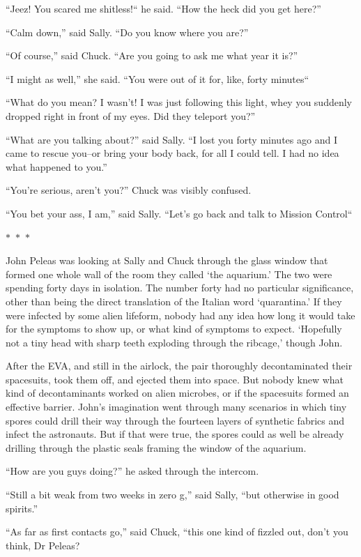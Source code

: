 \documentclass{memoir}
\newcommand{\starbreak}{%
\begin{center}
  $\ast$~$\ast$~$\ast$
\end{center}
}
\begin{document}
``Jeez! You scared me shitless!`` he said. ``How the heck did you get here?''

``Calm down,'' said Sally. ``Do you know where you are?''

``Of course,'' said Chuck. ``Are you going to ask me what year it is?''

``I might as well,'' she said. ``You were out of it for, like, forty minutes``

``What do you mean? I wasn't! I was just following this light, whey you suddenly dropped right in front of my eyes. Did they teleport you?''

``What are you talking about?'' said Sally. ``I lost you forty minutes ago and I came to rescue you--or bring your body back, for all I could tell. I had no idea what happened to you.''

``You're serious, aren't you?'' Chuck was visibly confused. 

``You bet your ass, I am,'' said Sally. ``Let's go back and talk to Mission Control``

\starbreak

John Peleas was looking at Sally and Chuck through the glass window that formed one whole wall of the room they called `the aquarium.' The two were spending forty days in isolation. The number forty had no particular significance, other than being the direct translation of the Italian word `quarantina.' If they were infected by some alien lifeform, nobody had any idea how long it would take for the symptoms to show up, or what kind of symptoms to expect. `Hopefully not a tiny head with sharp teeth exploding through the ribcage,' though John.

After the EVA, and still in the airlock, the pair thoroughly decontaminated their spacesuits,  took them off, and ejected them into space. But nobody knew what kind of decontaminants worked on alien microbes, or if the spacesuits formed an effective barrier. John's imagination went through many scenarios in which tiny spores could drill their way through the fourteen layers of synthetic fabrics and infect the astronauts. But if that were true, the spores could as well be already drilling through the plastic seals framing the window of the aquarium. 

``How are you guys doing?'' he asked through the intercom. 

``Still a bit weak from two weeks in zero g,'' said Sally, ``but otherwise in good spirits.''

``As far as first contacts go,'' said Chuck, ``this one kind of fizzled out, don't you think, Dr Peleas?
\end{document}
